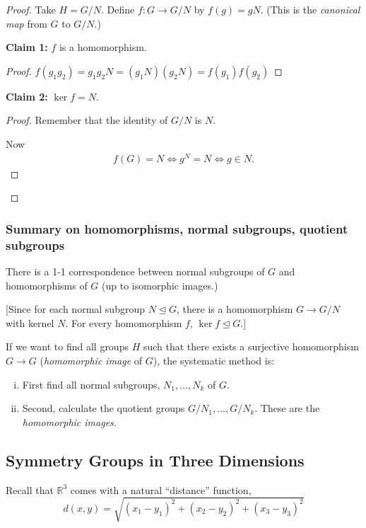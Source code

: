 \documentclass{article}
\theoremstyle{definition} \newtheorem*{definition}{Definition}
\newcommand{\reals}{\mathbb{R}} \newcommand{\rationals}{\mathbb{Q}}
\begin{document}
  \begin{proof} Take $H=G/N$. Define $f:G \rightarrow G/N$ by $f(g)=gN$. (This
    is the \textit{canonical map} from $G$ to $G/N$.)

    \textbf{Claim 1:} $f$ is a homomorphism.

    \begin{proof} $f(g_1g_2)=g_1g_2N=(g_1N)(g_2N)=f(g_1)f(g_2)$ \end{proof}

    \textbf{Claim 2:} $\ker f = N$.  \begin{proof} Remember that the identity of
      $G/N$ is $N$.
      
      Now 
      \begin{align*}
      f(G)=N \iff  g^N = N \iff g \in N. 
      \end{align*}
    \end{proof}
  \end{proof}

  \subsubsection*{Summary on homomorphisms, normal subgroups, quotient
  subgroups} There is a 1-1 correspondence between normal subgroups of $G$ and
  homomorphisms of $G$ (up to isomorphic images.)

  [Since for each normal subgroup $N \trianglelefteq G$, there is a
  homomorphism $G \rightarrow G/N$ with kernel $N$. For every homomorphism $f$,
$\ker f \trianglelefteq G$.]

  If we want to find all groups $H$ such that there exists a surjective
homomorphism $G \rightarrow G$ (\textit{homomorphic image} of $G$), the
systematic method is: \begin{enumerate}[(i)] \item First find all normal subgroups,
      $N_1, \dots, N_k$ of $G$.  \item Second, calculate the quotient groups
        $G/N_1, \dots, G/N_k$. These are the \textit{homomorphic images.}
    \end{enumerate}

  \subsection{Symmetry Groups in Three Dimensions}

  Recall that $\reals^3$  comes with a natural ``distance'' function, \[
  d(x,y)=\sqrt{(x_1 - y_1)^2 + (x_2 - y_2)^2 + (x_3 - y_3)^2} \]
\end{document}

